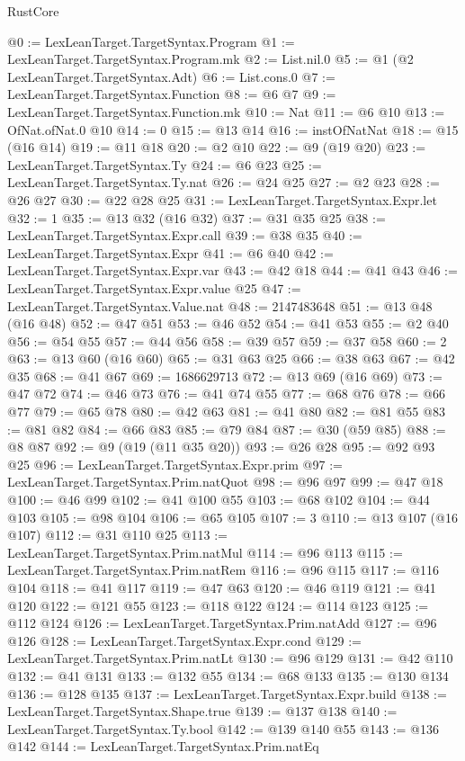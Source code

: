\begin{lexlean}{RustCore}
\begin{coremodule}
@0 := LexLeanTarget.TargetSyntax.Program
@1 := LexLeanTarget.TargetSyntax.Program.mk
@2 := List.nil.{0}
@5 := @1 (@2 LexLeanTarget.TargetSyntax.Adt)
@6 := List.cons.{0}
@7 := LexLeanTarget.TargetSyntax.Function
@8 := @6 @7
@9 := LexLeanTarget.TargetSyntax.Function.mk
@10 := Nat
@11 := @6 @10
@13 := OfNat.ofNat.{0} @10
@14 := 0
@15 := @13 @14
@16 := instOfNatNat
@18 := @15 (@16 @14)
@19 := @11 @18
@20 := @2 @10
@22 := @9 (@19 @20)
@23 := LexLeanTarget.TargetSyntax.Ty
@24 := @6 @23
@25 := LexLeanTarget.TargetSyntax.Ty.nat
@26 := @24 @25
@27 := @2 @23
@28 := @26 @27
@30 := @22 @28 @25
@31 := LexLeanTarget.TargetSyntax.Expr.let
@32 := 1
@35 := @13 @32 (@16 @32)
@37 := @31 @35 @25
@38 := LexLeanTarget.TargetSyntax.Expr.call
@39 := @38 @35
@40 := LexLeanTarget.TargetSyntax.Expr
@41 := @6 @40
@42 := LexLeanTarget.TargetSyntax.Expr.var
@43 := @42 @18
@44 := @41 @43
@46 := LexLeanTarget.TargetSyntax.Expr.value @25
@47 := LexLeanTarget.TargetSyntax.Value.nat
@48 := 2147483648
@51 := @13 @48 (@16 @48)
@52 := @47 @51
@53 := @46 @52
@54 := @41 @53
@55 := @2 @40
@56 := @54 @55
@57 := @44 @56
@58 := @39 @57
@59 := @37 @58
@60 := 2
@63 := @13 @60 (@16 @60)
@65 := @31 @63 @25
@66 := @38 @63
@67 := @42 @35
@68 := @41 @67
@69 := 1686629713
@72 := @13 @69 (@16 @69)
@73 := @47 @72
@74 := @46 @73
@76 := @41 @74 @55
@77 := @68 @76
@78 := @66 @77
@79 := @65 @78
@80 := @42 @63
@81 := @41 @80
@82 := @81 @55
@83 := @81 @82
@84 := @66 @83
@85 := @79 @84
@87 := @30 (@59 @85)
@88 := @8 @87
@92 := @9 (@19 (@11 @35 @20))
@93 := @26 @28
@95 := @92 @93 @25
@96 := LexLeanTarget.TargetSyntax.Expr.prim
@97 := LexLeanTarget.TargetSyntax.Prim.natQuot
@98 := @96 @97
@99 := @47 @18
@100 := @46 @99
@102 := @41 @100 @55
@103 := @68 @102
@104 := @44 @103
@105 := @98 @104
@106 := @65 @105
@107 := 3
@110 := @13 @107 (@16 @107)
@112 := @31 @110 @25
@113 := LexLeanTarget.TargetSyntax.Prim.natMul
@114 := @96 @113
@115 := LexLeanTarget.TargetSyntax.Prim.natRem
@116 := @96 @115
@117 := @116 @104
@118 := @41 @117
@119 := @47 @63
@120 := @46 @119
@121 := @41 @120
@122 := @121 @55
@123 := @118 @122
@124 := @114 @123
@125 := @112 @124
@126 := LexLeanTarget.TargetSyntax.Prim.natAdd
@127 := @96 @126
@128 := LexLeanTarget.TargetSyntax.Expr.cond
@129 := LexLeanTarget.TargetSyntax.Prim.natLt
@130 := @96 @129
@131 := @42 @110
@132 := @41 @131
@133 := @132 @55
@134 := @68 @133
@135 := @130 @134
@136 := @128 @135
@137 := LexLeanTarget.TargetSyntax.Expr.build
@138 := LexLeanTarget.TargetSyntax.Shape.true
@139 := @137 @138
@140 := LexLeanTarget.TargetSyntax.Ty.bool
@142 := @139 @140 @55
@143 := @136 @142
@144 := LexLeanTarget.TargetSyntax.Prim.natEq

\end{coremodule}
\end{lexlean}
